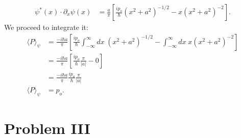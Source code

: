\documentclass[letterpaper,11pt,twoside]{article}
\newcommand{\braket}[1]{\langle#1\rangle}
\begin{document}
\begin{enumerate}[itemsep=0pt,topsep=0pt,label=\alph*.]
\begin{align*}
    \psi^*(x)\cdot\partial_x\psi(x)&=\frac{a}{\pi}\left[\frac{ip_o}{\hbar}(x^2+a^2)^{-1/2}-x(x^2+a^2)^{-2}\right].
  \end{align*}
  We proceed to integrate it:
  \begin{align*}
    \braket{P}_\psi&=\frac{-i\hbar a}{\pi}\left[\frac{ip_o}{\hbar}\int_{-\infty}^\infty dx\;(x^2+a^2)^{-1/2}-\int_{-\infty}^\infty dx\;x(x^2+a^2)^{-2}\right]\\
    &=\frac{-i\hbar a}{\pi}\left[\frac{ip_o}{\hbar}\frac{\pi}{|a|}-0\right]\\
    &=\frac{-i\hbar a}{\pi}\frac{ip_o}{\hbar}\frac{\pi}{|a|}\\
    \braket{P}_\psi&=p_o.
  \end{align*}
\end{enumerate}
\section*{Problem III}
\end{document}
